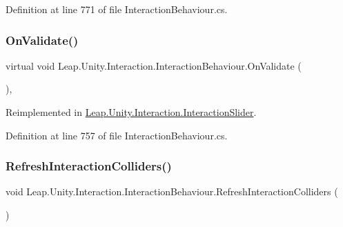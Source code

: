 Definition at line 771 of file Interaction\+Behaviour.\+cs.

\mbox{\label{class_leap_1_1_unity_1_1_interaction_1_1_interaction_behaviour_a1a7a6e32f61fa0819c7d35107f3c7fd4}} 
\subsubsection{\texorpdfstring{OnValidate()}{OnValidate()}}
{\footnotesize\ttfamily virtual void Leap.\+Unity.\+Interaction.\+Interaction\+Behaviour.\+On\+Validate (\begin{DoxyParamCaption}{ }\end{DoxyParamCaption})\hspace{0.3cm}{\ttfamily [protected]}, {\ttfamily [virtual]}}



Reimplemented in \mbox{\hyperlink{class_leap_1_1_unity_1_1_interaction_1_1_interaction_slider_a6e91615fa8a4ab9ea1d211b3dcaa0e2b}{Leap.\+Unity.\+Interaction.\+Interaction\+Slider}}.



Definition at line 757 of file Interaction\+Behaviour.\+cs.

\mbox{\label{class_leap_1_1_unity_1_1_interaction_1_1_interaction_behaviour_a523c4be606d88a5323fb925a04b08c47}} 
\subsubsection{\texorpdfstring{RefreshInteractionColliders()}{RefreshInteractionColliders()}}
{\footnotesize\ttfamily void Leap.\+Unity.\+Interaction.\+Interaction\+Behaviour.\+Refresh\+Interaction\+Colliders (\begin{DoxyParamCaption}{ }\end{DoxyParamCaption})}



